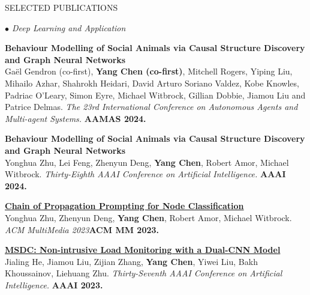 \documentclass{resume} %
\begin{document}
\begin{rSection}{SELECTED PUBLICATIONS}
\begin{rSubsection}{\large\em $\bullet$ Deep Learning and Application}{}{}{}
\item {\bf Behaviour Modelling of Social Animals via Causal Structure Discovery and Graph Neural Networks}\\
		Ga\"el Gendron (co-first), \textbf{Yang Chen (co-first)}, Mitchell Rogers, Yiping Liu, Mihailo Azhar, Shahrokh Heidari, David Arturo Soriano Valdez, Kobe Knowles, Padriac O'Leary, Simon Eyre, Michael Witbrock, Gillian Dobbie, Jiamou Liu and Patrice Delmas. {\em  The 23rd International Conference on Autonomous Agents and Multi-agent Systems.} \textbf{AAMAS 2024.}\\
\item {\bf Behaviour Modelling of Social Animals via Causal Structure Discovery and Graph Neural Networks}\\
		Yonghua Zhu, Lei Feng, Zhenyun Deng, \textbf{Yang Chen}, Robert Amor, Michael Witbrock. {\em Thirty-Eighth AAAI Conference on Artificial Intelligence.} \textbf{AAAI 2024.}\\
\item{
	\href{}{\bf Chain of Propagation Prompting for Node Classification}}\\
	Yonghua Zhu, Zhenyun Deng, \textbf{Yang Chen}, Robert Amor, Michael Witbrock. {\em ACM MultiMedia 2023}\textbf{ACM MM 2023.}\\
\item {
	\href{}{\bf MSDC: Non-intrusive Load Monitoring with a Dual-CNN Model}}\\
		Jialing He, Jiamou Liu, Zijian Zhang, \textbf{Yang Chen}, Yiwei Liu, Bakh Khoussainov, Liehuang Zhu. {\em Thirty-Seventh AAAI Conference on Artificial Intelligence.} \textbf{AAAI 2023.}\\
\end{rSubsection}




\end{rSection}
\end{document}
